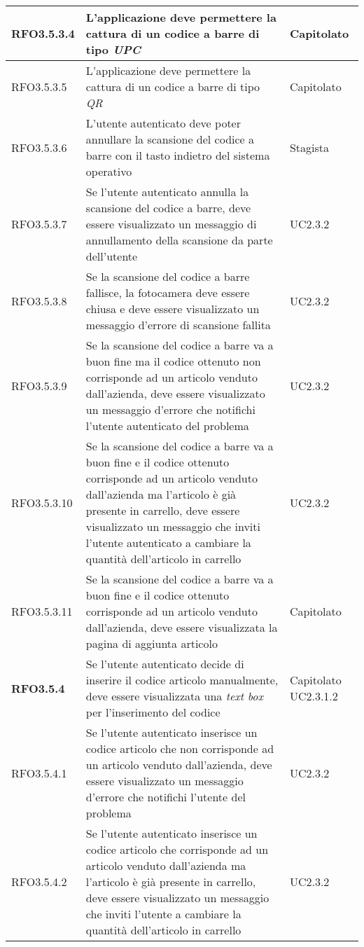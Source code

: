 {\begin{center}
\begin{longtable}{ | >{\centering\arraybackslash}p{2.5cm} | >{\arraybackslash}p{7cm} | >{\centering\arraybackslash}p{2cm} | }
RFO3.5.3.4 & L'applicazione deve permettere la cattura di un codice a barre di tipo \textit{UPC} & Capitolato \\ \hline
RFO3.5.3.5 & L'applicazione deve permettere la cattura di un codice a barre di tipo \textit{QR} & Capitolato \\ \hline
RFO3.5.3.6 & L'utente autenticato deve poter annullare la scansione del codice a barre con il tasto indietro del sistema operativo & Stagista \\ \hline
RFO3.5.3.7 & Se l'utente autenticato annulla la scansione del codice a barre, deve essere visualizzato un messaggio di annullamento della scansione da parte dell'utente & UC2.3.2 \\ \hline
RFO3.5.3.8 & Se la scansione del codice a barre fallisce, la fotocamera deve essere chiusa e deve essere visualizzato un messaggio d'errore di scansione fallita & UC2.3.2 \\ \hline
RFO3.5.3.9 & Se la scansione del codice a barre va a buon fine ma il codice ottenuto non corrisponde ad un articolo venduto dall'azienda, deve essere visualizzato un messaggio d'errore che notifichi l'utente autenticato del problema & UC2.3.2 \\ \hline
RFO3.5.3.10 & Se la scansione del codice a barre va a buon fine e il codice ottenuto corrisponde ad un articolo venduto dall'azienda ma l'articolo è già presente in carrello, deve essere visualizzato un messaggio che inviti l'utente autenticato a cambiare la quantità dell'articolo in carrello & UC2.3.2 \\ \hline
RFO3.5.3.11 & Se la scansione del codice a barre va a buon fine e il codice ottenuto corrisponde ad un articolo venduto dall'azienda, deve essere visualizzata la pagina di aggiunta articolo & Capitolato \\ \hline
\textbf{RFO3.5.4} & Se l'utente autenticato decide di inserire il codice articolo manualmente, deve essere visualizzata una \textit{text box} per l'inserimento del codice & Capitolato UC2.3.1.2 \\ \hline
RFO3.5.4.1 & Se l'utente autenticato inserisce un codice articolo che non corrisponde ad un articolo venduto dall'azienda, deve essere visualizzato un messaggio d'errore che notifichi l'utente del problema & UC2.3.2 \\ \hline
RFO3.5.4.2 & Se l'utente autenticato inserisce un codice articolo che corrisponde ad un articolo venduto dall'azienda ma l'articolo è già presente in carrello, deve essere visualizzato un messaggio che inviti l'utente a cambiare la quantità dell'articolo in carrello & UC2.3.2 \\ \hline

\end{longtable}
\end{center}}
